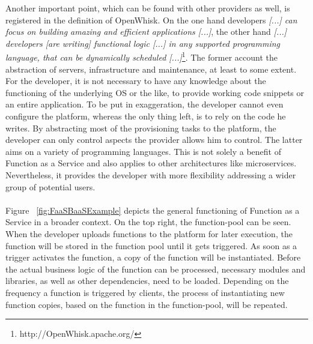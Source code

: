 \documentclass[11pt]{article}
\begin{document}
Another important point, which can be found with other providers as well, is registered in the definition of OpenWhisk. On the one hand developers \glqq \textit{[...] can focus on building amazing and efficient applications [...]}\grqq{}, the other hand \glqq \textit{[...] developers [are writing] functional logic [...] in any supported programming language, that can be dynamically scheduled [...]}\grqq{}\footnote{http://OpenWhisk.apache.org/}. The former account the abstraction of servers, infrastructure and maintenance, at least to some extent. For the developer, it is not necessary to have any knowledge about the functioning of the underlying OS or the like, to provide working code snippets or an entire application. To be put in exaggeration, the developer cannot even configure the platform, whereas the only thing left, is to rely on the code he writes. By abstracting most of the provisioning tasks to the platform, the developer can only control aspects the provider allows him to control. The latter aims on a variety of programming languages. This is not solely a benefit of Function as a Service and also applies to other architectures like microservices.
Nevertheless, it provides the developer with more flexibility addressing a wider group of potential users.\\\\
Figure ~\ref{fig:FaaSBaaSExample} depicts the general functioning of Function as a Service in a broader context. On the top right, the function-pool can be seen. When the developer uploads functions to the platform for later execution, the function will be stored in the function pool until it gets triggered. As soon as a trigger activates the function, a copy of the function will be instantiated. Before the actual business logic of the function can be processed, necessary modules and libraries, as well as other dependencies, need to be loaded. Depending on the frequency a function is triggered by clients, the process of instantiating new function copies, based on the function in the function-pool, will be repeated.    
\end{document}
